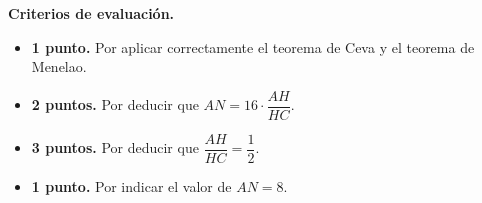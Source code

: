 \textbf{Criterios de evaluación.}
\begin{itemize}
    \item \textbf{1 punto.} Por aplicar correctamente el teorema de Ceva y el teorema de Menelao.
    \item \textbf{2 puntos.} Por deducir que $AN = 16 \cdot \dfrac{AH}{HC}$.
    \item \textbf{3 puntos.} Por deducir que $\dfrac{AH}{HC} = \dfrac{1}{2}$.
    \item \textbf{1 punto.} Por indicar el valor de $AN = 8$.
\end{itemize}